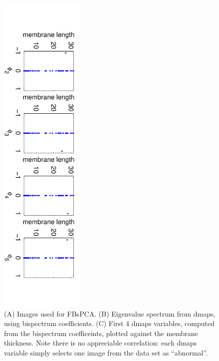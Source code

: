 \documentclass[12pt]{article}
\begin{document}
\begin{figure}[H]
\hspace{-1cm}
\includegraphics[width=4cm, angle=90]{FBsPCA_dmaps}
\caption{(A) Images used for FBsPCA. (B) Eigenvalue spectrum from dmaps, using bispectrum coefficients. (C) First 4 dmaps variables, computed from the bispectrum coefficeints, plotted against the membrane thickness. Note there is no appreciable correlation: each dmaps variable simply selects one image from the data set as ``abnormal''.}
\end{figure}




\end{document}

